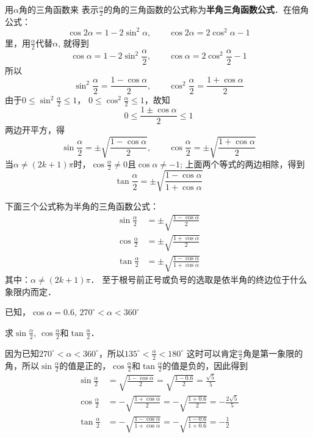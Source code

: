 用$\alpha$角的三角函数来
表示$\frac{\alpha}{2}$的角的三角函数的公式称为\textbf{半角三角函数公式}．在倍角公式：
\[\cos2\alpha=1-2\sin^2\alpha,\qquad \cos2\alpha=2\cos^2\alpha-1\]
里，用$\frac{\alpha}{2}$代替$\alpha$, 就得到
\[\cos\alpha=1-2\sin^2\frac{\alpha}{2},\qquad \cos\alpha=2\cos^2\frac{\alpha}{2}-1\]
所以
\[\sin^2\frac{\alpha}{2}=\frac{1-\cos\alpha}{2},\qquad \cos^2\frac{\alpha}{2}=\frac{1+\cos\alpha}{2}\]
由于$0\le \sin^2 \frac{\alpha}{2}\le 1$，
$0\le \cos^2\frac{\alpha}{2}\le 1$，故知
\[0\le \frac{1\pm\cos\alpha}{2}\le 1\]
两边开平方，得
\[\sin\frac{\alpha}{2}=\pm\sqrt{\frac{1-\cos\alpha}{2}},\qquad \cos\frac{\alpha}{2}=\pm\sqrt{\frac{1+\cos\alpha}{2}}\]
当$\alpha\ne(2k+1)\pi$时，$\cos\frac{\alpha}{2}\ne 0$且$\cos\alpha\ne -1$; 上面两个等式的两边相除，得到
\[\tan\frac{\alpha}{2}=\pm\sqrt{\frac{1-\cos\alpha}{1+\cos\alpha}}\]

下面三个公式称为半角的三角函数公式：
\begin{align}
    \sin\frac{\alpha}{2}&=\pm\sqrt{\frac{1-\cos\alpha}{2}}\\
     \cos\frac{\alpha}{2}&=\pm\sqrt{\frac{1+\cos\alpha}{2}}\\
     \tan\frac{\alpha}{2}&=\pm\sqrt{\frac{1-\cos\alpha}{1+\cos\alpha}}
\end{align}
其中：$\alpha\ne (2k+1)\pi$．
至于根号前正号或负号的选取是依半角的终边位于什么象限内而定．

\begin{example}
已知，$\cos\alpha=0.6$, $270^{\circ}<\alpha<360^{\circ}$

求$\sin \frac{\alpha}{2}$, $\cos\frac{\alpha}{2}$和$\tan \frac{\alpha}{2}$．
\end{example}

\begin{solution}
因为已知$270^{\circ}<\alpha<360^{\circ}$，所以$135^{\circ}<\frac{\alpha}{2}<180^{\circ}$
这时可以肯定$\frac{\alpha}{2}$角是第一象限的角，所以$\sin \frac{\alpha}{2}$的值是正的，$\cos\frac{\alpha}{2}$和$\tan \frac{\alpha}{2}$的值是负的，因此得到
\[\begin{split}
    \sin\frac{\alpha}{2}&=\sqrt{\frac{1-\cos\alpha}{2}}=\sqrt{\frac{1-0.6}{2}}=\frac{\sqrt{5}}{5}\\
     \cos\frac{\alpha}{2}&=-\sqrt{\frac{1+\cos\alpha}{2}}=-\sqrt{\frac{1+0.6}{2}}=-\frac{2\sqrt{5}}{5}\\
     \tan\frac{\alpha}{2}&=-\sqrt{\frac{1-\cos\alpha}{1+\cos\alpha}}=-\sqrt{\frac{1-0.6}{1+0.6}}=-\frac{1}{2}
\end{split}\]
\end{solution}

